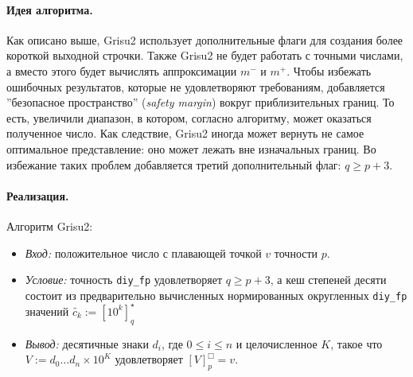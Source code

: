 \documentclass[specialist,subf,href,colorlinks=true,14pt
,times,mtpro,specialist
]{disser}
\begin{document}
\paragraph{Идея алгоритма.} 
Как описано выше, \textsf{Grisu2} использует дополнительные флаги для создания более короткой выходной строчки. 
Также \textsf{Grisu2} не будет работать с точными числами, а вместо этого будет вычислять аппроксимации $m^{-}$ и $m^+$. 
Чтобы избежать ошибочных результатов, которые не удовлетворяют требованиям, добавляется ''безопасное пространство'' (\textit{safety margin}) вокруг приблизительных границ.
То есть, увеличили диапазон, в котором, согласно алгоритму, может оказаться полученное число.  
Как следствие, \textsf{Grisu2} иногда может вернуть не самое оптимальное представление: оно может лежать вне изначальных границ. 
Во избежание таких проблем добавляется третий дополнительный флаг: $q \geqslant p + 3$.

\paragraph{Реализация.}
Алгоритм \textsf{Grisu2}: \begin{itemize}
\item \textit{Вход:} положительное число с плавающей точкой $v$ точности $p$.
\item \textit{Условие:} точность \texttt{diy\_fp} удовлетворяет $q \geqslant p + 3$, а кеш степеней десяти состоит из предварительно вычисленных нормированных округленных  \texttt{diy\_fp} значений $\tilde{c_k} := \left[ 10^k \right]_q^{\star}$
\item \textit{Вывод:} десятичные знаки $d_i$, где $0 \leqslant i \leqslant n$ и целочисленное $K$, такое что $V:=d_0\dots d_n \times 10 ^K$ удовлетворяет $[V]^{\Box}_p = v$. 
\end{itemize}
\end{document}
